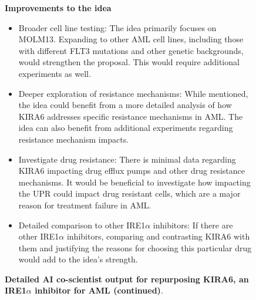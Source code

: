 \begin{figure}[htbp!]
\begin{tcolorbox}[
    colback=black!5!white,
    colframe=black!60!white,
    title=\textbf{KIRA6 for AML (continued)},
    fonttitle=\bfseries,
    arc=3mm,
    boxrule=1pt,
    bottomrule=2pt,
]
\textbf{Improvements to the idea}
\begin{itemize}
    \item Broader cell line testing: The idea primarily focuses on MOLM13. Expanding to other AML cell lines, including those with different FLT3 mutations and other genetic backgrounds, would strengthen the proposal. This would require additional experiments as well.
    \item Deeper exploration of resistance mechanisms: While mentioned, the idea could benefit from a more detailed analysis of how KIRA6 addresses specific resistance mechanisms in AML. The idea can also benefit from additional experiments regarding resistance mechanism impacts.
    \item Investigate drug resistance: There is minimal data regarding KIRA6 impacting drug efflux pumps and other drug resistance mechanisms. It would be beneficial to investigate how impacting the UPR could impact drug resistant cells, which are a major reason for treatment failure in AML.
    \item Detailed comparison to other IRE1$\alpha$ inhibitors: If there are other IRE1$\alpha$ inhibitors, comparing and contrasting KIRA6 with them and justifying the reasons for choosing this particular drug would add to the idea's strength.
\end{itemize}
\end{tcolorbox}
\vspace{0.1cm}
\caption{\textbf{Detailed AI co-scientist output for repurposing KIRA6, an IRE1$\alpha$ inhibitor for AML (continued)}.}
\label{fig:ex_kira6_6}
\end{figure}



